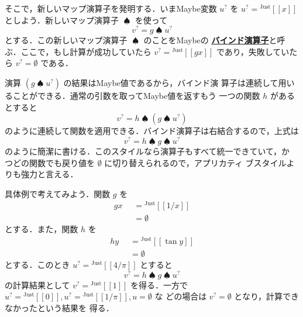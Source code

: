\documentclass[a5paper,twoside,fleqn,draft]{jsbook}
\def\[{\left[\!\left[}
\def\]{\right]\!\right]}
\newcommand{\keyword}[1]{{\underline{\textbf{#1}}}}
\newcommand{\mKeyword}[1]{\mathsf{#1}} %
\newcommand{\mOtherwiseKeyword}{\mKeyword{otherwise}}
\DeclareMathOperator{\mOtherwise}{\mOtherwiseKeyword}
\newcommand{\mNothing}{\emptyset}
\DeclareMathOperator{\mBindMaybe}{\spadesuit}
\newcommand{\mValueConstructor}[1]{\mathrm{#1}}
\newcommand{\mGenericValueAssemble}[2]{{}^\mValueConstructor{#1}\[#2\]}
\newcommand{\mJustWith}[1]{\mGenericValueAssemble{Just}{#1}}
\newcommand{\mMaybe}[1]{{#1}^?}
\newcommand{\mGuard}[1]{\mathop{\mid_{#1}}}
\begin{document}

そこで，新しいマップ演算子を発明する．いまMaybe変数 $\mMaybe{u}$ を
$\mMaybe{u}=\mJustWith{x}$ としよう．新しいマップ演算子 $\mBindMaybe$
を使って
\begin{equation}
  \mMaybe{v}=g\mBindMaybe\mMaybe{u}
\end{equation}
とする．この新しいマップ演算子 $\mBindMaybe$ のことをMaybeの
\keyword{バインド演算子}と呼ぶ．ここで，もし計算が成功していたら
$\mMaybe{v}=\mJustWith{gx}$ であり，失敗していたら
$\mMaybe{v}=\mNothing$ である．

演算 $(g\mBindMaybe\mMaybe{u})$ の結果はMaybe値であるから，バインド演
算子は連続して用いることができる．通常の引数を取ってMaybe値を返すもう
一つの関数 $h$ があるとすると
\begin{equation}
  \mMaybe{v}=h\mBindMaybe{}(g\mBindMaybe\mMaybe{u})
\end{equation}
のように連続して関数を適用できる．バインド演算子は右結合するので，上式は
\begin{equation}
  \label{eq:maybe-z-bind-style}
  \mMaybe{v}=h\mBindMaybe g\mBindMaybe\mMaybe{u}
\end{equation}
のように簡潔に書ける．このスタイルなら演算子もすべて統一できていて，か
つどの関数でも戻り値を $\mNothing$ に切り替えられるので，アプリカティ
ブスタイルよりも強力と言える．

具体例で考えてみよう．関数 $g$ を
\begin{equation}
  \begin{aligned}
    gx&\mGuard{x\neq0}=\mJustWith{1/x}\\
    &\mGuard{\mOtherwise}=\mNothing
  \end{aligned}
\end{equation}
とする．また，関数 $h$ を
\begin{equation}
  \begin{aligned}
    hy&\mGuard{-\frac{\pi}{2}<y<\frac{\pi}{2}}=\mJustWith{\tan y}\\
    &\mGuard{\mOtherwise}=\mNothing
  \end{aligned}
\end{equation}
とする．このとき $\mMaybe{u}=\mJustWith{4/\pi}$ とすると
\begin{equation}
\mMaybe{v}=h\mBindMaybe g\mBindMaybe\mMaybe{u}
\end{equation}
の計算結果として $\mMaybe{v}=\mJustWith{1}$ を得る．一方で
$\mMaybe{u}=\mJustWith{0},\mMaybe{u}=\mJustWith{1/\pi},u=\mNothing$ な
どの場合は $\mMaybe{v}=\mNothing$ となり，計算できなかったという結果を
得る．
\end{document}

